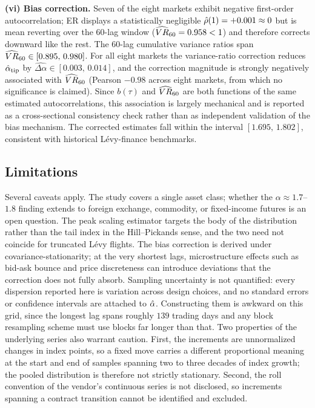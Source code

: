 \documentclass[conference]{IEEEtran}
\begin{document}
\textbf{(vi) Bias correction.}
Seven of the eight markets exhibit negative first-order autocorrelation; ER
displays a statistically negligible $\hat{\rho}(1)=+0.001\approx 0$ but is
mean reverting over the 60-lag window ($\widehat{VR}_{60}=0.958<1$) and therefore
corrects downward like the rest.
The 60-lag cumulative variance ratios span $\widehat{VR}_{60}\in[0.895,\,0.980]$.
For all eight markets the variance-ratio correction reduces
$\hat{\alpha}_{\mathrm{tip}}$ by $\widehat{\Delta\alpha}\in[0.003,\,0.014]$, and
the correction magnitude is strongly negatively associated with
$\widehat{VR}_{60}$ (Pearson $-0.98$ across eight markets, from which no significance
is claimed). Since $b(\tau)$ and $\widehat{VR}_{60}$ are both
functions of the same estimated autocorrelations, this association is largely
mechanical and is reported as a cross-sectional consistency check rather than
as independent validation of the bias mechanism.
The corrected estimates fall within the interval $[1.695,\,1.802]$,
consistent with historical Lévy-finance benchmarks.

\subsection{Limitations}
Several caveats apply.
The study covers a single asset class; whether the $\alpha\approx 1.7$--$1.8$
finding extends to foreign exchange, commodity, or fixed-income futures is an
open question.
The peak scaling estimator targets the body of the distribution rather than
the tail index in the Hill--Pickands sense, and the two need not coincide for
truncated Lévy flights.
The bias correction is derived under covariance-stationarity; at the very
shortest lags, microstructure effects such as bid-ask bounce and price
discreteness can introduce deviations that the correction does not fully absorb.
Sampling uncertainty is not quantified: every dispersion reported here is
variation across design choices, and no standard errors or confidence
intervals are attached to $\hat{\alpha}$. Constructing them is awkward on this
grid, since the longest lag spans roughly $139$ trading days and any block
resampling scheme must use blocks far longer than that.
Two properties of the underlying series also warrant caution. First, the
increments are unnormalized changes in index points, so a fixed move carries a
different proportional meaning at the start and end of samples spanning two to
three decades of index growth; the pooled distribution is therefore not
strictly stationary. Second, the roll convention of the vendor's continuous
series is not disclosed, so increments spanning a contract transition cannot be
identified and excluded.
\end{document}
